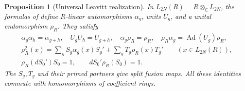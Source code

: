 \documentclass[11pt]{article}
\newtheorem{proposition}[theorem]{Proposition}
\theoremstyle{remark}
\newcommand{\C}{\mathbb C}
\begin{document}
\begin{proposition}[Universal Leavitt realization]\label{prop:ring-realization}
In $L_{2N}(R)=R\otimes_\C L_{2N}$, the formulas of
\cite[Section~5.4]{RW2} define $R$-linear automorphisms $\alpha_g$, units
$U_g$, and a unital endomorphism $\rho_R$. They satisfy
\begin{gather}
 \alpha_g\alpha_h=\alpha_{g+h},\quad U_gU_h=U_{g+h},\quad
 \alpha_g\rho_R=\rho_R,\quad
 \rho_R\alpha_g=\operatorname{Ad}(U_g)\rho_R,\label{eq:ring-covariance}\\
 \rho_R^2(x)=\sum_gS_g\alpha_g(x)S_g'
                   +\sum_gT_g\rho_R(x)T_g'\qquad(x\in L_{2N}(R)),
 \label{eq:ring-fusion}\\
 \rho_R(dS_0')S_0=1,\qquad dS_0'\rho_R(S_0)=1.
 \label{eq:ring-snake}
\end{gather}
The $S_g,T_g$ and their primed partners give split fusion maps.
All these identities commute with homomorphisms of coefficient rings.
\end{proposition}
\end{document}
